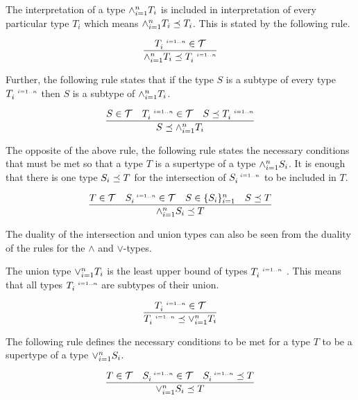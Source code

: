 \documentclass[runningheads]{llncs}
\newcommand{\s}{\scriptscriptstyle\ \,}
\newcommand{\TT}{{\cal T}}
\begin{document}
The interpretation of a type $\land_{i=1}^n\/T_i$ is included in
interpretation of every particular type $T_i$ which means
$\land_{i=1}^n\/T_i\preceq\/T_i$. This is stated by the following
rule.

\begin{equation}
\label{rul:land-preceq-elems}
\dfrac{T_i^{\s\/i=1..n}\in\TT}
      {\land_{i=1}^n\/T_i\preceq\/T_i^{\s\/i=1..n}} 
\end{equation}

Further, the following rule states that if the type $S$ is a subtype
of every type $T_i^{\s\/i=1..n}$ then $S$ is a subtype of
$\land_{i=1}^n\/T_i$.

\begin{equation}
\label{rul:lbound-preceq-land}
\dfrac{S\in\TT\quad\/T_i^{\s\/i=1..n}\in\TT\quad\/S\preceq\/T_i^{\s\/i=1..n}}
      {S\preceq\land_{i=1}^n\/T_i}  
\end{equation} 

The opposite of the above rule, the following rule states the
necessary conditions that must be met so that a type $T$ is a
supertype of a type $\land_{i=1}^n\/S_i$. It is enough that there is
one type $S_i\preceq\/T$ for the intersection of $S_i^{\s\/i=1..n}$ to
be included in $T$.

\begin{equation}
\label{rul:land-preceq-ubound}
\dfrac{T\in\TT\quad\/S_i^{\s\/i=1..n}\in\TT\quad\/S\in\{S_i\}_{i=1}^n\quad\/S\preceq\/T}
      {\land_{i=1}^n\/S_i\preceq\/T}  
\end{equation} 

The duality of the intersection and union types can also be seen from
the duality of the rules for the $\land$ and $\lor$-types.

The union type $\lor_{i=1}^n\/T_i$ is the least upper bound of types
$T_i^{\s\/i=1..n}$ \cite{Pierce1991}. This means that all types
$T_i^{\s\/i=1..n}$ are subtypes of their union.

\begin{equation}
\label{rul:lor-preceq-elems}
\dfrac{T_i^{\s\/i=1..n}\in\TT}
      {T_i^{\s\/i=1..n}\preceq\lor_{i=1}^n\/T_i}
\end{equation}

The following rule defines the necessary conditions to be met for a
type $T$ to be a supertype of a type $\lor_{i=1}^n\/S_i$.

\begin{equation}
\label{rul:lor-preceq-ubound}
\dfrac{T\in\TT\quad\/S_i^{\s\/i=1..n}\in\TT\quad\/S_i^{\s\/i=1..n}\preceq\/T}
      {\lor_{i=1}^n\/S_i\preceq\/T}  
\end{equation}
\end{document}
